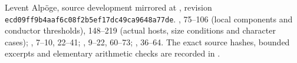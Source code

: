 Levent Alp\"oge, source development mirrored at
, revision
\newline\texttt{ecd09ff9b4aaf6c08f2b5ef17dc49ca9648a77de}.
,
75--106 (local components and conductor thresholds),
148--219 (actual hosts, size conditions and character cases);
, 7--10, 22--41;
, 9--22, 60--73;
, 36--64.
The exact source hashes, bounded excerpts and elementary arithmetic
checks are recorded in
.
